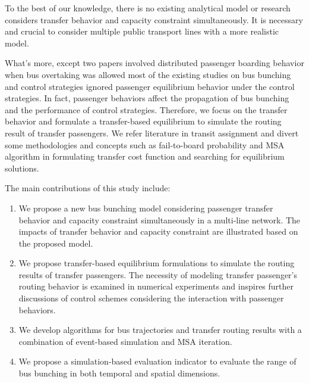\documentclass[smallextended]{svjour3}       %
\begin{document}
\begin{Abstract}
To the best of our knowledge, there is no existing analytical model or research considers transfer behavior and capacity constraint simultaneously.
It is necessary and crucial to consider multiple public transport lines with a more realistic model.

What's more, except two papers involved distributed passenger boarding behavior when bus overtaking was allowed \citep{2016Sun,2017Wu}
most of the existing studies on bus bunching and control strategies ignored passenger equilibrium behavior under the control strategies.
In fact, passenger behaviors affect the propagation of bus bunching and the performance of control strategies.
Therefore, we focus on the transfer behavior and formulate a transfer-based equilibrium to simulate the routing result of transfer passengers.
We refer literature in transit assignment \citep{2016Sun,2013Long,2014Szeto,2016Jiang}
and divert some methodologies and concepts such as fail-to-board probability and MSA algorithm in formulating transfer cost function and searching for equilibrium solutions.

The main contributions of this study include:
\begin{enumerate}
    \item We propose a new bus bunching model considering passenger transfer behavior and capacity constraint simultaneously in a multi-line network.
    The impacts of transfer behavior and capacity constraint are illustrated based on the proposed model.
    \item We propose transfer-based equilibrium formulations to simulate the routing results of transfer passengers.
    The necessity of modeling transfer passenger's routing behavior is examined in numerical experiments and inspires further discussions of control schemes considering the interaction with passenger behaviors.
    \item We develop algorithms for bus trajectories and transfer routing results with a combination of event-based simulation and MSA iteration. 
    \item We propose a simulation-based evaluation indicator to evaluate the range of bus bunching in both temporal and spatial dimensions.
\end{enumerate}


\end{Abstract}
\end{document}
